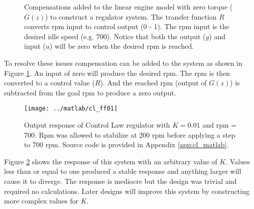 \documentclass{article}
\begin{document}
\begin{figure}[!htp]
\begin{center}


\end{center}

\caption{Compensations added to the linear engine model with zero
torque ($G(z)$) to construct a regulator system.
The transfer function $R$ converts rpm input to control output (0 - 1).
The rpm input is the desired idle speed (e.g. 700).
Notice that both the output ($y$) and input ($u$) will be zero when
the desired rpm is reached.}
\label{fig:clid02}
\end{figure}

To resolve these issues compensation can be added to the
system as shown in Figure \ref{fig:clid02}.
An input of zero will produce the desired rpm.
The rpm is then converted to a control value ($R$).
And the reached rpm (output of $G(z)$) is subtracted from
the goal rpm to produce a zero output.

\begin{figure}[!htp]
\begin{center}
\texttt{[image: ../matlab/cl\_ff01]}
\end{center}
\caption{Output response of Control Law regulator with $K = 0.01$
and rpm = $700$.
Rpm was allowed to stabilize at 200 rpm before applying a step
to 700 rpm.
Source code is provided in Appendix \ref{app:cl_matlab}.}
\label{fig:cl_plot1}
\end{figure}

Figure \ref{fig:cl_plot1} shows the response of this system
with an arbitrary value of $K$.
Values less than or equal to one produced a stable response and
anything larger will cause it to diverge.
The response is mediocre but the design was trivial and
required no calculations.
Later designs will improve this system by constructing more
complex values for $K$.
\end{document}
